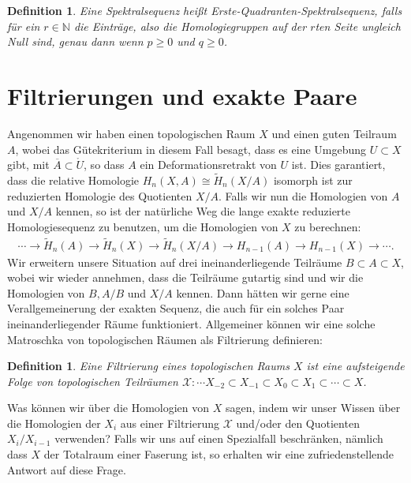\documentclass[12pt, hidelinks]{article}
\numberwithin{conj}{section}
\newtheorem{definition}[conj]{Definition}
\begin{document}
\begin{definition}
    Eine Spektralsequenz heißt Erste-Quadranten-Spektralsequenz, falls für ein $r \in \mathbb{N}$ die Einträge, also die Homologiegruppen auf der $r$ten Seite ungleich Null sind, genau dann wenn $p \geq 0$ und $q \geq 0$.
\end{definition}

\section{Filtrierungen und exakte Paare}
Angenommen wir haben einen topologischen Raum $X$ und einen guten Teilraum $A$, wobei das Gütekriterium in diesem Fall besagt, dass es eine Umgebung $U \subset X$ gibt, mit $\overline{A} \subset \mathring{U}$, so dass $A$ ein Deformationsretrakt von $U$ ist. Dies garantiert, dass die relative Homologie $H_n(X,A) \cong \tilde{H}_n(X/A)$ isomorph ist zur reduzierten Homologie des Quotienten $X/A$. Falls wir nun die Homologien von $A$ und $X/A$ kennen, so ist der natürliche Weg die lange exakte reduzierte Homologiesequenz zu benutzen, um die Homologien von $X$ zu berechnen:
\begin{align}
    \cdots \to \tilde{H}_n(A) \to \tilde{H}_n(X) \to \tilde{H}_n(X/A) \to H_{n-1}(A) \to H_{n-1}(X) \to \cdots.
\end{align}
Wir erweitern unsere Situation auf drei ineinanderliegende Teilräume $B \subset A \subset X$, wobei wir wieder annehmen, dass die Teilräume gutartig sind und wir die Homologien von $B, A/B$ und $X/A$ kennen. Dann hätten wir gerne eine Verallgemeinerung der exakten Sequenz, die auch für ein solches Paar ineinanderliegender Räume funktioniert. Allgemeiner können wir eine solche Matroschka von topologischen Räumen als Filtrierung definieren:

\begin{definition}
    Eine Filtrierung eines topologischen Raums $X$ ist eine aufsteigende Folge von topologischen Teilräumen $\mathcal{X}: \cdots X_{-2} \subset X_{-1} \subset X_{0} \subset X_{1} \subset \cdots \subset X$.
\end{definition}

Was können wir über die Homologien von $X$ sagen, indem wir unser Wissen über die Homologien der $X_i$ aus einer Filtrierung $\mathcal{X}$ und/oder den Quotienten $X_i/X_{i-1}$ verwenden? Falls wir uns auf einen Spezialfall beschränken, nämlich dass $X$ der Totalraum einer Faserung ist, so erhalten wir eine zufriedenstellende Antwort auf diese Frage.
\end{document}
